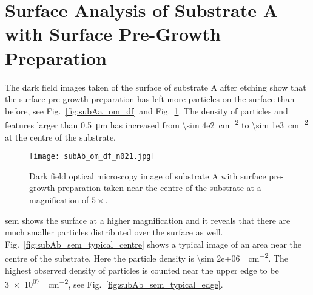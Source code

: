 \clearpage
%
%
\section[Surface Analysis of Substrate A with Surface Pre-Growth Preparation]{Surface Analysis of Substrate A with Surface Pre-Growth Preparation%
    }\label{sec:subAb}

The dark field images taken of the surface of substrate A after etching show that the surface pre-growth preparation has left more particles on the surface than before, see Fig.~\ref{fig:subAa_om_df} and Fig.~\ref{fig:subAb_om_df}. The density of particles and features larger than \SI{0.5}{\micro\metre} has increased from \SI{\sim 4e2}{\centi\metre^{-2}} to \SI{\sim 1e3}{\centi\metre^{-2}} at the centre of the substrate.

\begin{figure}[htbp]
    \centering
    \texttt{[image: subAb\_om\_df\_n021.jpg]}
    \caption[Dark field optical microscopy image of substrate A with surface pre-growth preparation.]{Dark field optical microscopy image of substrate A with surface pre-growth preparation taken near the centre of the substrate at a magnification of $5\times$.}\label{fig:subAb_om_df}
\end{figure}

\Ac{sem} shows the surface at a higher magnification and it reveals that there are much smaller particles distributed over the surface as well. Fig.~\ref{fig:subAb_sem_typical_centre} shows a typical image of an area near the centre of the substrate. Here the particle density is  \SI{\sim 2e+06}{\particle\centi\metre^{-2}}. The highest observed density of particles is counted near the upper edge to be \SI{3e+07}{\particle\centi\metre^{-2}}, see Fig.~\ref{fig:subAb_sem_typical_edge}.

